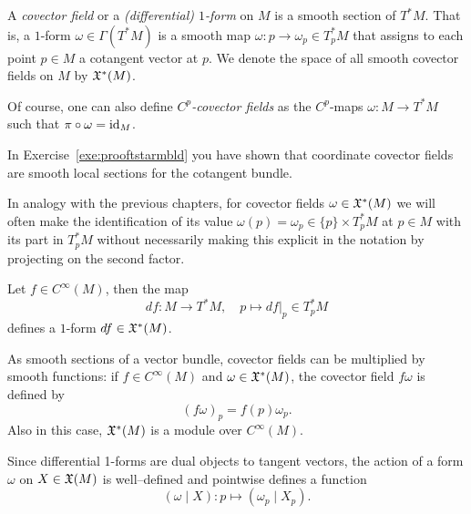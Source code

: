 \begin{definition}\label{def:covfield}
  A \emph{covector field} or a \emph{(differential) $1$-form} on $M$ is a smooth section of $T^*M$.
  That is, a $1$-form $\omega\in\Gamma(T^*M)$ is a smooth map $\omega: p \to \omega_p \in T_p^*M$ that assigns to each point $p\in M$ a cotangent vector at $p$.
  We denote the space of all smooth covector fields on $M$ by $\mathfrak{X}^*(M)$.

  Of course, one can also define \emph{$C^p$-covector fields} as the $C^p$-maps $\omega:M\to T^*M$ such that $\pi\circ\omega = \operatorname{id}_M$.
\end{definition}

\begin{remark}
  In Exercise~\ref{exe:prooftstarmbld} you have shown that coordinate covector fields are smooth local sections for the cotangent bundle.
\end{remark}

In analogy with the previous chapters, for covector fields $\omega\in\mathfrak{X}^*(M)$ we will often make the identification of its value $\omega(p) = \omega_p \in \{p\}\times T^*_p M$ at $p\in M$ with its part in $T_p^*M$ without necessarily making this explicit in the notation by projecting on the second factor.

\begin{example}
  Let $f\in C^\infty(M)$, then the map
  \begin{equation}
    df : M \to T^*M, \quad p \mapsto df|_p \in T^*_p M
  \end{equation}
  defines a $1$-form $df\in\mathfrak{X}^*(M)$.
\end{example}

As smooth sections of a vector bundle, covector fields can be multiplied by smooth functions: if $f\in C^\infty(M)$ and $\omega\in\mathfrak{X}^*(M)$, the covector field $f\omega$ is defined by
\begin{equation}
  (f\omega)_p = f(p)\omega_p.
\end{equation}
Also in this case, $\mathfrak{X}^*(M)$ is a module over $C^\infty(M)$.

Since differential 1-forms are dual objects to tangent vectors, the action of a form $\omega$ on $X\in\mathfrak{X}(M)$ is well--defined and pointwise defines a function
\begin{equation}
  (\omega \mid X) : p \mapsto (\omega_p \mid X_p).
\end{equation}

